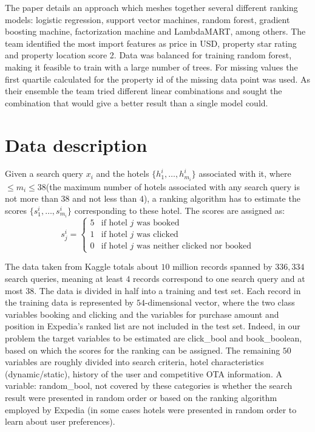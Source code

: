 \documentclass{llncs}
\begin{document}
The paper \cite{DBLP:journals/corr/LiuXZYPLSW13} details an approach which meshes together several different ranking models: logistic regression, support vector machines, random forest, gradient boosting machine, factorization machine and LambdaMART, among others. The team identified the most import features as price in USD, property star rating and property location score 2. Data was balanced for training random forest, making it feasible to train with a large number of trees.  For missing values the first quartile calculated for the property id of the missing data point was used. As their ensemble the team tried different linear combinations and sought the combination that would give a better result than a single model could.
 
\section{Data description}
Given a search query $x_{i}$ and the hotels $\{h_{1}^{i},\dots,h_{m_{i}}^{i}\}$ associated with it, where $\leq m_{i} \leq 38$(the maximum number of hotels associated with any search query is not more than $38$ and not less than $4$), a ranking algorithm has to estimate the scores  $\{s_{1}^{i},\dots,s_{m_{i}}^{i}\}$ corresponding to these hotel. The scores are assigned as:
$$
s_{j}^{i}=
\left\{
	\begin{array}{ll}
		5  & \mbox{if hotel $j$ was booked }   \\
		1 & \mbox{if hotel $j$ was clicked }  \\
		0 & \mbox{if hotel $j$ was neither clicked nor booked}
	\end{array}
\right.
$$
  
The data taken from Kaggle totals about $10$ million records spanned by $336,334$ search queries, meaning at least $4$ records correspond to one search query and at most $38$. The data is divided in half into a training and test set. Each record in the training data is represented by $54$-dimensional vector, where the two class variables booking and clicking and the variables for purchase amount and position in Expedia's ranked list are not included in the test set. Indeed, in our problem the target variables to be estimated are click\_bool and book\_boolean, based on which the scores for the ranking can be assigned. The remaining $50$ variables are roughly divided into search criteria, hotel characteristics (dynamic/static), history of the user and competitive OTA information. A variable: random\_bool, not covered by these categories is whether the search result were presented in random order or based on the ranking algorithm employed by Expedia (in some cases hotels were presented in random order to learn about user preferences).
\end{document}
